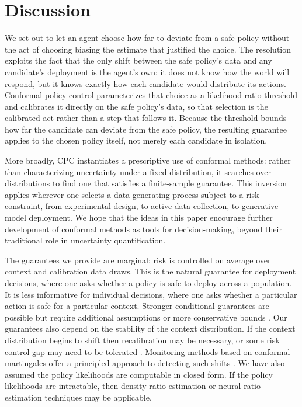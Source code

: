 \section{Discussion}

We set out to let an agent choose how far to deviate from a safe policy without the act of choosing biasing the estimate that justified the choice. The resolution exploits the fact that the only shift between the safe policy's data and any candidate's deployment is the agent's own: it does not know how the world will respond, but it knows exactly how each candidate would distribute its actions. Conformal policy control parameterizes that choice as a likelihood-ratio threshold and calibrates it directly on the safe policy's data, so that selection is the calibrated act rather than a step that follows it. Because the threshold bounds how far the candidate can deviate from the safe policy, the resulting guarantee applies to the chosen policy itself, not merely each candidate in isolation.

More broadly, CPC instantiates a prescriptive use of conformal methods: rather than characterizing uncertainty under a fixed distribution, it searches over distributions to find one that satisfies a finite-sample guarantee. This inversion applies wherever one selects a data-generating process subject to a risk constraint, from experimental design, to active data collection, to generative model deployment. We hope that the ideas in this paper encourage further development of conformal methods as tools for decision-making, beyond their traditional role in uncertainty quantification.

The guarantees we provide are marginal: risk is controlled on average over context and calibration data draws.
This is the natural guarantee for deployment decisions, where one asks whether a policy is safe to deploy across a population.
It is less informative for individual decisions, where one asks whether a particular action is safe for a particular context.
Stronger conditional guarantees are possible but require additional assumptions or more conservative bounds \citep{thomas2019preventing}.
Our guarantees also depend on the stability of the context distribution.
If the context distribution begins to shift then recalibration may be necessary, or some risk control gap may need to be tolerated \citep{barber2023}.
Monitoring methods based on conformal martingales offer a principled approach to detecting such shifts \citep{prinster2025watch}.
We have also assumed the policy likelihoods are computable in closed form. If the policy likelihoods are intractable, then density ratio estimation \citep{sugiyama2012density} or neural ratio estimation \citep{cranmer2020frontier} techniques may be applicable.

